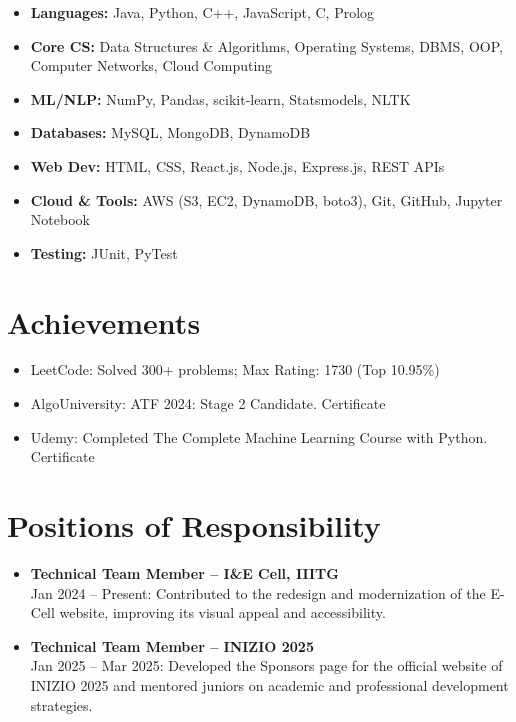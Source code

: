 \documentclass[11pt, a4paper]{article}
\begin{document}
\begin{itemize}[left=0.5cm]
  \item \textbf{Languages:} Java, Python, C++, JavaScript, C, Prolog \\
  \item \textbf{Core CS:} Data Structures \& Algorithms, Operating Systems, DBMS, OOP, Computer Networks, Cloud Computing \\
  \item \textbf{ML/NLP:} NumPy, Pandas, scikit-learn, Statsmodels, NLTK \\
  \item \textbf{Databases:} MySQL, MongoDB, DynamoDB \\
  \item \textbf{Web Dev:} HTML, CSS, React.js, Node.js, Express.js, REST APIs \\
  \item \textbf{Cloud \& Tools:} AWS (S3, EC2, DynamoDB, boto3), Git, GitHub, Jupyter Notebook \\
  \item \textbf{Testing:} JUnit, PyTest
\end{itemize}

\vspace{0.3cm}

\section{Achievements}

\begin{itemize}[left=0.5cm]
  \item LeetCode: Solved 300+ problems; Max Rating: 1730 (Top 10.95\%) \\
  \item AlgoUniversity: ATF 2024: Stage 2 Candidate. Certificate \\
  \item Udemy: Completed The Complete Machine Learning Course with Python. Certificate
\end{itemize}

\vspace{0.3cm}

\section{Positions of Responsibility}

\begin{itemize}[left=0.5cm]
  \item \textbf{Technical Team Member – I\&E Cell, IIITG} \\
    Jan 2024 – Present: Contributed to the redesign and modernization of the E-Cell website, improving its visual appeal and accessibility. \\
  \item \textbf{Technical Team Member – INIZIO 2025} \\
    Jan 2025 – Mar 2025: Developed the Sponsors page for the official website of INIZIO 2025 and mentored juniors on academic and professional development strategies.
\end{itemize}
\end{document}
